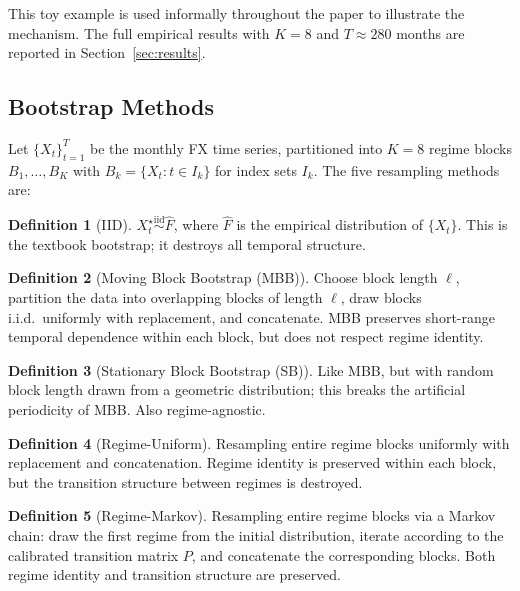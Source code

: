 \documentclass[11pt,a4paper]{article}
\theoremstyle{definition}
\newtheorem{definition}{Definition}
\begin{document}
This toy example is used informally throughout the paper to
illustrate the mechanism. The full empirical results with
$K = 8$ and $T \approx 280$ months are reported in
Section~\ref{sec:results}.

\subsection{Bootstrap Methods}

Let $\{X_t\}_{t=1}^{T}$ be the monthly FX time series, partitioned into $K=8$ regime blocks $B_1, \ldots, B_K$ with $B_k = \{X_t : t \in I_k\}$ for index sets $I_k$. The five resampling methods are:

\begin{definition}[IID]
$X_t^{\star} \stackrel{\text{iid}}{\sim} \hat{F}$, where $\hat{F}$ is the empirical distribution of $\{X_t\}$. This is the textbook bootstrap; it destroys all temporal structure.
\end{definition}

\begin{definition}[Moving Block Bootstrap (MBB)]
Choose block length $\ell$, partition the data into overlapping blocks of length $\ell$, draw blocks i.i.d.\ uniformly with replacement, and concatenate. MBB preserves short-range temporal dependence within each block, but does not respect regime identity.
\end{definition}

\begin{definition}[Stationary Block Bootstrap (SB)]
Like MBB, but with random block length drawn from a geometric distribution; this breaks the artificial periodicity of MBB. Also regime-agnostic.
\end{definition}

\begin{definition}[Regime-Uniform]
Resampling entire regime blocks uniformly with replacement and concatenation. Regime identity is preserved within each block, but the transition structure between regimes is destroyed.
\end{definition}

\begin{definition}[Regime-Markov]
Resampling entire regime blocks via a Markov chain: draw the first regime from the initial distribution, iterate according to the calibrated transition matrix $P$, and concatenate the corresponding blocks. Both regime identity and transition structure are preserved.
\end{definition}
\end{document}
